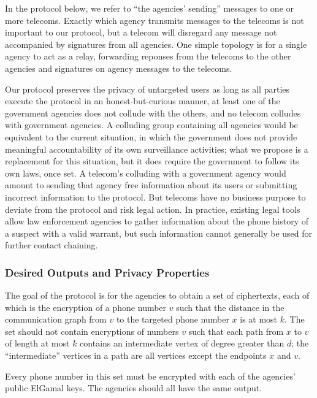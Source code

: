 In the protocol below, we refer to ``the agencies' sending'' messages to one or more telecoms. Exactly which agency transmits messages to the telecoms is not important to our protocol, but a telecom will disregard any message not accompanied by signatures from all agencies. One simple topology is for a single agency to act as a relay, forwarding reponses from the telecoms to the other agencies and signatures on agency messages to the telecoms.



Our protocol preserves the privacy of untargeted users as long as all parties execute the protocol in an honest-but-curious manner, 
at least one of the government agencies does not collude with the others, and no telecom colludes with government agencies. 
A colluding group containing all agencies would be equivalent to the current situation, in which the government does not provide meaningful accountability of its own surveillance activities; what we propose is a replacement for this situation, but it does require the government to follow its own laws, once set. 
A telecom's colluding with a government agency would amount to sending that agency free information about its users or submitting incorrect information to the protocol. But telecoms have no business purpose to deviate from the protocol and risk legal action. In practice, existing legal tools allow law enforcement agencies to gather information about the phone history of a suspect with a valid warrant, but such information cannot generally be used for further contact chaining.

\subsubsection{Desired Outputs and Privacy Properties}

The goal of the protocol is for the agencies to obtain a set of ciphertexts, each of which is the encryption of a phone number $v$ such that the distance in the communication graph from $v$ to the targeted phone number $x$ is at most $k$. The set should not contain encryptions of numbers $v$ such that each path from $x$ to $v$ of length at most $k$ contains an intermediate vertex of degree greater than $d$; the ``intermediate'' vertices in a path are all vertices except the endpoints $x$ and $v$.



Every phone number in this set must be encrypted with each of the agencies' public ElGamal keys. The agencies should all have the same output.

